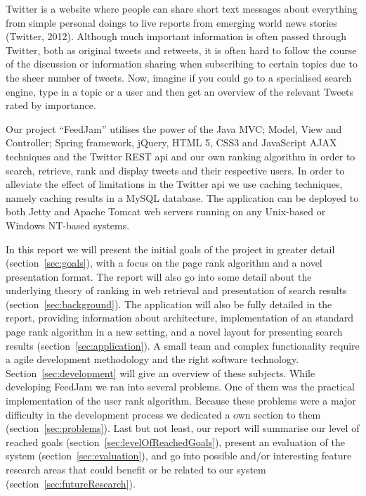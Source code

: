 Twitter is a website where people can share short text messages about everything from simple personal doings to live reports from emerging world news stories (Twitter, 2012). Although much important information is often passed through Twitter, both as original tweets and retweets, it is often hard to follow the course of the discussion or information sharing when subscribing to certain topics due to the sheer number of tweets. Now, imagine if you could go to a specialised search engine, type in a topic or a user and then get an overview of the relevant Tweets rated by importance.

Our project “FeedJam” utilises the power of the Java MVC; Model, View and Controller; Spring framework, jQuery, HTML 5, CSS3 and JavaScript AJAX techniques and the Twitter REST api and our own ranking algorithm in order to search, retrieve, rank and display tweets and their respective users. In order to alleviate the effect of limitations in the Twitter api we use caching techniques, namely caching results in a MySQL database. The application can be deployed to both Jetty and Apache Tomcat web servers running on any Unix-based or Windows NT-based systems.

In this report we will present the initial goals of the project in greater detail (section~\ref{sec:goals}), with a focus on the page rank algorithm and a novel presentation format. The report will also go into some detail about the underlying theory of ranking in web retrieval and presentation of search results (section~\ref{sec:background}). The application will also be fully detailed in the report, providing information about architecture, implementation of an standard page rank algorithm in a new setting, and a novel layout for presenting search results (section~\ref{sec:application}). A small team and complex functionality require a agile development methodology and the right software technology. Section~\ref{sec:development} will give an overview of these subjects. While developing FeedJam we ran into several problems. One of them was the practical implementation of the user rank algorithm. Because these problems were a major difficulty in the development process we dedicated a own section to them (section~\ref{sec:problems}). Last but not least, our report will summarise our level of reached goals (section~\ref{sec:levelOfReachedGoals}), present an evaluation of the system (section~\ref{sec:evaluation}), and go into possible and/or interesting feature research areas that could benefit or be related to our system (section~\ref{sec:futureResearch}).